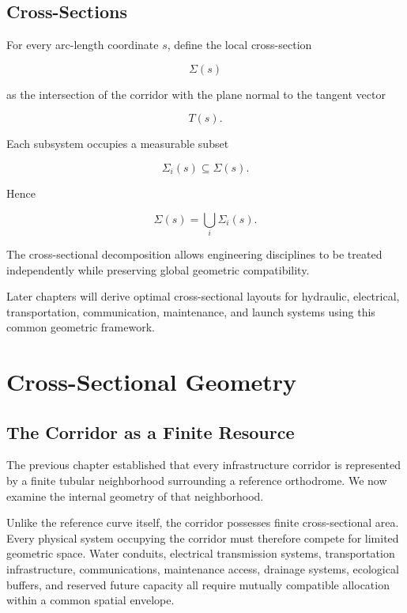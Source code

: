 \documentclass[11pt,fleqn]{book}
\numberwithin{equation}{chapter}
\theoremstyle{plain}
\theoremstyle{definition}
\theoremstyle{remark}
\begin{document}

\section{Cross-Sections}

For every arc-length coordinate $s$, define the local cross-section

\[
\Sigma(s)
\]

as the intersection of the corridor with the plane normal to the tangent
vector

\[
T(s).
\]

Each subsystem occupies a measurable subset

\[
\Sigma_i(s)
\subseteq
\Sigma(s).
\]

Hence

\[
\Sigma(s)
=
\bigcup_i\Sigma_i(s).
\]

The cross-sectional decomposition allows engineering disciplines to be
treated independently while preserving global geometric compatibility.

Later chapters will derive optimal cross-sectional layouts for hydraulic,
electrical, transportation, communication, maintenance, and launch
systems using this common geometric framework.

\chapter{Cross-Sectional Geometry}

\section{The Corridor as a Finite Resource}

The previous chapter established that every infrastructure corridor is
represented by a finite tubular neighborhood surrounding a reference
orthodrome. We now examine the internal geometry of that neighborhood.

Unlike the reference curve itself, the corridor possesses finite
cross-sectional area. Every physical system occupying the corridor must
therefore compete for limited geometric space. Water conduits,
electrical transmission systems, transportation infrastructure,
communications, maintenance access, drainage systems, ecological
buffers, and reserved future capacity all require mutually compatible
allocation within a common spatial envelope.
\end{document}
